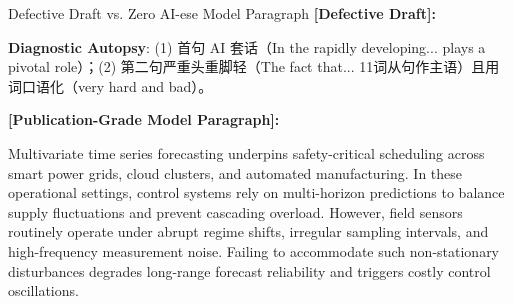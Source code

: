 \begin{ExampleBox}{Defective Draft vs. Zero AI-ese Model Paragraph}
\textbf{\color{TargetHighlight}[Defective Draft]:}\par
{}\par\vspace{4pt}
\textbf{Diagnostic Autopsy}: (1)  首句 AI 套话（In the rapidly developing... plays a pivotal role）；(2)  第二句严重头重脚轻（The fact that... 11词从句作主语）且用词口语化（very hard and bad）。\par\vspace{6pt}
\textbf{\color{AcadNavy}[Publication-Grade Model Paragraph]:}\par
Multivariate time series forecasting underpins safety-critical scheduling across smart power grids, cloud clusters, and automated manufacturing. In these operational settings, control systems rely on multi-horizon predictions to balance supply fluctuations and prevent cascading overload. However, field sensors routinely operate under abrupt regime shifts, irregular sampling intervals, and high-frequency measurement noise. Failing to accommodate such non-stationary disturbances degrades long-range forecast reliability and triggers costly control oscillations.
\end{ExampleBox}
